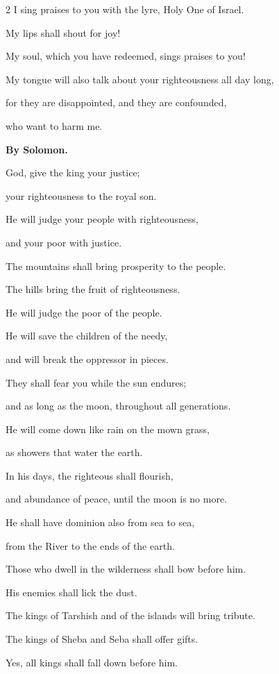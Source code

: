 \begin{multicols}{2}
	I sing praises to you with the lyre, Holy One of Israel.
	
	
	\myverse{}My lips shall shout for joy!
	
	My soul, which you have redeemed, sings praises to you!
	
	
	\myverse{}My tongue will also talk about your righteousness all day long,
	
	for they are disappointed, and they are confounded,
	
	who want to harm me.
	
	
	\mychapter{}\textbf{By Solomon.}
	
	\quad \myverse*{}God, give the king your justice;
	
	your righteousness to the royal son.
	
	
	\myverse{}He will judge your people with righteousness,
	
	and your poor with justice.
	
	
	\myverse{}The mountains shall bring prosperity to the people.
	
	The hills bring the fruit of righteousness.
	
	
	\myverse{}He will judge the poor of the people.
	
	He will save the children of the needy,
	
	and will break the oppressor in pieces.
	
	
	\myverse{}They shall fear you while the sun endures;
	
	and as long as the moon, throughout all generations.
	
	
	\myverse{}He will come down like rain on the mown grass,
	
	as showers that water the earth.
	
	
	\myverse{}In his days, the righteous shall flourish,
	
	and abundance of peace, until the moon is no more.
	
	
	\myverse{}He shall have dominion also from sea to sea,
	
	from the River to the ends of the earth.
	
	
	\myverse{}Those who dwell in the wilderness shall bow before him.
	
	His enemies shall lick the dust.
	
	
	\myverse{}The kings of Tarshish and of the islands will bring tribute.
	
	The kings of Sheba and Seba shall offer gifts.
	
	
	\myverse{}Yes, all kings shall fall down before him.
	

\end{multicols}
